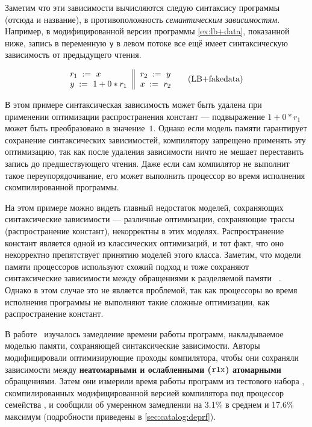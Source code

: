Заметим что эти зависимости вычисляются следую 
синтаксису программы (отсюда и название), 
в противоположность \emph{семантическим зависимостям}. 
Например, в модифицированной версии 
программы \ref{ex:lb+data}, показанной ниже, 
запись в переменную \texttt{y} в левом потоке все ещё 
имеет синтаксическую зависимость от предыдущего чтения. 

\begin{equation*}
\inarrII{
  \readInst{}{r_1}{x}           \\
  \writeInst{}{y}{1 + 0 * r_1}  \\
}{
  \readInst{}{r_2}{y}      \\
  \writeInst{}{x}{r_2}     \\
}
\tag{LB+fakedata}\label{ex:lb+fakedata}
\end{equation*}

В этом примере синтаксическая зависимость может быть удалена
при применении оптимизации распространения констант ---
подвыражение $1 + 0 * r_1$ может быть преобразовано в значение~$1$.
Однако если модель памяти гарантирует сохранение синтаксических зависимостей,
компилятору запрещено применять эту оптимизацию, 
так как после удаления зависимости ничто не мешает 
переставить запись до предшествующего чтения. 
Даже если сам компилятор не выполнит такое переупорядочивание, 
его может выполнить процессор во время исполнения 
скомпилированной программы. 

На этом примере можно видеть главный недостаток моделей, 
сохраняющих синтаксические зависимости --- 
различные оптимизации, сохраняющие трассы
(\eg распространение констант), некорректны в этих моделях. 
Распространение констант является одной из 
классических оптимизаций, и тот факт, 
что оно некорректно препятствует принятию 
моделей этого класса. 
Заметим, что модели памяти процессоров 
используют схожий подход и тоже 
сохраняют синтаксические зависимости 
между обращениями к разделяемой памяти%
~\cite{Sarkar-al:PLDI11, Alglave-al:TOPLAS14, Pulte-al:POPL18}.
Однако в этом случае это не является проблемой, 
так как процессоры во время исполнения программы 
не выполняют такие сложные оптимизации, 
как распространение констант.

В работе~\cite{Ou-Demsky:OOPSLA18} изучалось 
замедление времени работы программ, накладываемое моделью памяти, 
сохраняющей синтаксические зависимости. 
Авторы модифицировали оптимизирующие проходы компилятора, 
чтобы они сохраняли зависимости между 
\textbf{неатомарными и ослабленными ($\mathtt{rlx}$) атомарными} обращениями. 
Затем они измерили время работы программ из тестового набора \SPECCPU,
скомпилированных модифицированной версией компилятора \LLVM 
под процессор семейства , и сообщили 
об умеренном замедлении на 3.1\% в среднем и 17.6\% максимум
(подробности приведены в \ref{sec:catalog:deprf}). 


